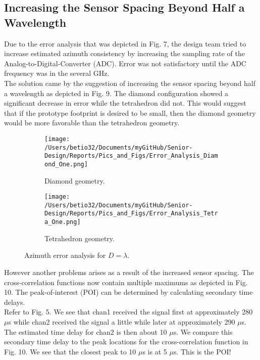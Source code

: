 \documentclass[12pt]{article}
\begin{document}
\pagebreak

\subsection{Increasing the Sensor Spacing Beyond Half a Wavelength}

\noindent Due to the error analysis that was depicted in Fig. 7, the design team tried to increase estimated azimuth consistency by increasing the sampling rate of the Analog-to-Digital-Converter (ADC). Error was not satisfactory until the ADC frequency was in the several GHz.\\

\noindent The solution came by the suggestion of increasing the sensor spacing beyond half a wavelength as depicted in Fig. 9. The diamond configuration showed a significant decrease in error while the tetrahedron did not. This would suggest that if the prototype footprint is desired to be small, then the diamond geometry would be more favorable than the tetrahedron geometry. 

\begin{figure}[!h]
	\centering
	\begin{subfigure}{.5\textwidth}
  		\centering
  		\texttt{[image: /Users/betio32/Documents/myGitHub/Senior-Design/Reports/Pics\_and\_Figs/Error\_Analysis\_Diamond\_One.png]}
  		\caption{Diamond geometry.}
  		\label{fig:Error_Analysis_Diamond_One}
	\end{subfigure}%
	\begin{subfigure}{.5\textwidth}
  		\centering
  		\texttt{[image: /Users/betio32/Documents/myGitHub/Senior-Design/Reports/Pics\_and\_Figs/Error\_Analysis\_Tetra\_One.png]}
  		\caption{Tetrahedron geometry.}
  		\label{fig:Error_Analysis_Tetra_One}
	\end{subfigure}
	\caption{Azimuth error analysis for $D=\lambda$.}
\end{figure}

\noindent However another problems arises as a result of the increased sensor spacing. The cross-correlation functions now contain multiple maximums as depicted in Fig. 10. The peak-of-interest (POI) can be determined by calculating secondary time delays.\\

\noindent Refer to Fig. 5. We see that chan1 received the signal first at approximately 280 $\mu$s while chan2 received the signal a little while later at approximately 290 $\mu$s. The estimated time delay for chan2 is then about 10 $\mu$s. We compare this secondary time delay to the peak locations for the cross-correlation function in Fig. 10. We see that the closest peak to 10 $\mu$s is at 5 $\mu$s. This is the POI!
\end{document}
